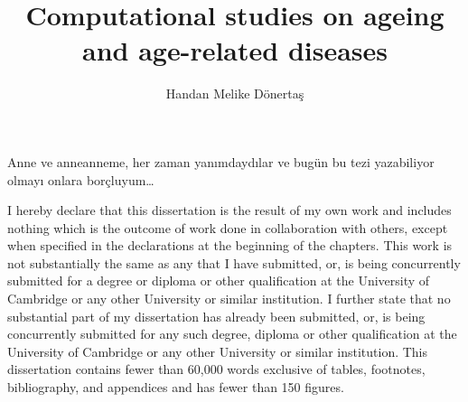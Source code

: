\documentclass[12pt,twoside]{unicam}
\title{Computational studies on ageing and age-related diseases}
\author{Handan Melike Dönertaş}
\subtitle{}
\date{}
\begin{document}
  \maketitle

\frontmatter %
\pagestyle{empty} %

  \begin{dedication}
    Anne ve anneanneme, her zaman yanımdaydılar ve bugün bu tezi yazabiliyor olmayı onlara borçluyum\ldots{}
  \end{dedication}

  \begin{declaration}
    I hereby declare that this dissertation is the result of my own work and includes nothing which is the outcome of work done in collaboration with others, except when specified in the declarations at the beginning of the chapters. This work is not substantially the same as any that I have submitted, or, is being concurrently submitted for a degree or diploma or other qualification at the University of Cambridge or any other University or similar institution. I further state that no substantial part of my dissertation has already been submitted, or, is being concurrently submitted for any such degree, diploma or other qualification at the University of Cambridge or any other University or similar institution. This dissertation contains fewer than 60,000 words exclusive of tables, footnotes, bibliography, and appendices and has fewer than 150 figures.
  \end{declaration}
\end{document}
